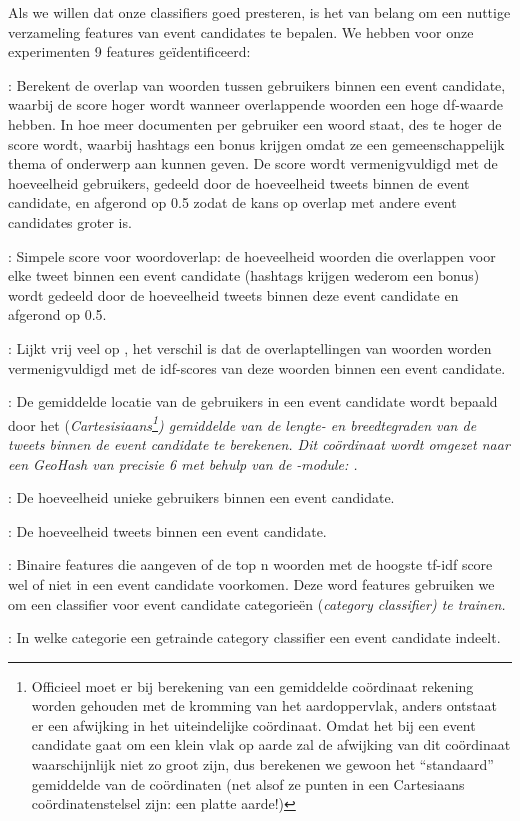 {{\label{FeatureSelector}

Als we willen dat onze classifiers goed presteren, is het van belang om een 
nuttige verzameling features van event candidates te bepalen. We hebben voor 
onze experimenten 9 features ge\"identificeerd:

\begin{bullets}
\item {}: Berekent de overlap van woorden tussen gebruikers binnen een 
event candidate, waarbij de score hoger wordt wanneer overlappende woorden een 
hoge df-waarde hebben. In hoe meer documenten per gebruiker een woord staat, des 
te hoger de score wordt, waarbij hashtags een bonus krijgen omdat ze een 
gemeenschappelijk thema of onderwerp aan kunnen geven. De score wordt 
vermenigvuldigd met de hoeveelheid gebruikers, gedeeld door de hoeveelheid 
tweets binnen de event candidate, en afgerond op 0.5 zodat de kans op overlap 
met andere event candidates groter is.
\item {}: Simpele score voor woordoverlap: de hoeveelheid woorden die 
overlappen voor elke tweet binnen een event candidate (hashtags krijgen wederom 
een bonus) wordt gedeeld door de hoeveelheid tweets binnen deze event candidate 
en afgerond op 0.5.
\item {}: Lijkt vrij veel op , het verschil is dat de 
overlaptellingen van woorden worden vermenigvuldigd met de idf-scores van deze 
woorden binnen een event candidate.
\item {}: De gemiddelde locatie van de gebruikers in een event candidate wordt 
bepaald door het (\it{Cartesisiaans}\footnote{Officieel moet er bij berekening van 
een gemiddelde coördinaat rekening worden gehouden met de
kromming van het aardoppervlak, anders ontstaat er een afwijking in het 
uiteindelijke coördinaat. Omdat het bij een event candidate gaat om een klein 
vlak op aarde zal de afwijking van dit coördinaat waarschijnlijk niet zo groot 
zijn, dus berekenen we gewoon het “standaard” gemiddelde van de coördinaten (net 
alsof ze punten in een Cartesiaans coördinatenstelsel zijn: een platte aarde!)}) 
gemiddelde van de lengte- en breedtegraden van de tweets binnen de event 
candidate te berekenen. Dit coördinaat wordt omgezet naar een GeoHash van 
precisie 6 met behulp van de -module: .
\item {}: De hoeveelheid unieke gebruikers binnen een event candidate.
\item {}: De hoeveelheid tweets binnen een event candidate.
\item {}: Binaire features die aangeven of de top n woorden met de hoogste 
tf-idf score wel of niet in een event candidate voorkomen. Deze word features 
gebruiken we om een classifier voor event candidate categorieën (\it{category 
classifier}) te trainen.
\item {}: In welke categorie een getrainde category classifier een event 
candidate indeelt.
\end{bullets}

}}

